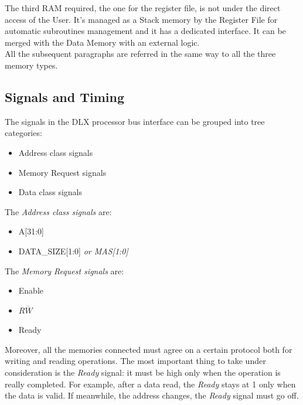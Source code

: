 The third RAM required, the one for the register file, is not under the direct access of the User. It's managed as a Stack memory by the Register File for automatic subroutines management and it has a dedicated interface. It can be merged with the Data Memory with an external logic.\\


All the subsequent paragraphs are referred in the same way to all the three memory types.

\subsection{Signals and Timing}
The signals in the DLX processor bus interface can be grouped into tree categories:
\begin{itemize}
	\itemsep0sp
    \item Address class signals
    \item Memory Request signals
    \item Data class signals
\end{itemize}

The \emph{Address class signals} are:
\begin{itemize}
	\itemsep0sp
    \item A{[31:0]}
    \item DATA\_SIZE{[1:0]} \emph{or MAS{[1:0]}}
\end{itemize}

The \emph{Memory Request signals} are:
\begin{itemize}
	\itemsep0sp
    \item Enable
    \item $R\overline{W}$
    \item Ready
\end{itemize}

Moreover, all the memories connected must agree on a certain protocol both for writing and reading operations. The most important thing to take under consideration is the \emph{Ready} signal: it must be high only when the operation is really completed. For example, after a data read, the \emph{Ready} stays at 1 only when the data is valid. If meanwhile, the address changes, the \emph{Ready} signal must go off.

